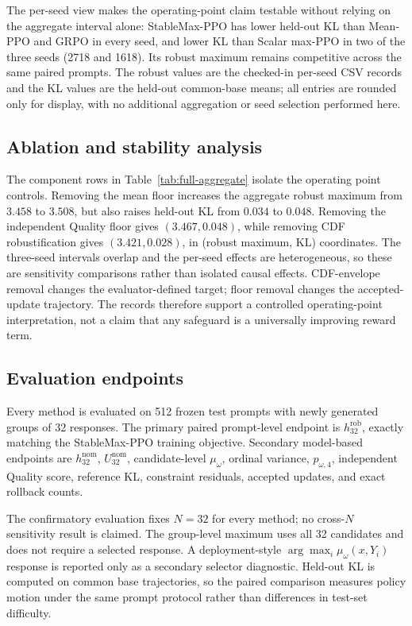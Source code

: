 The per-seed view makes the operating-point claim testable without relying on
the aggregate interval alone: StableMax-PPO has lower held-out KL than Mean-PPO
and GRPO in every seed, and lower KL than Scalar max-PPO in two of the three
seeds (2718 and 1618).  Its robust maximum remains competitive across the same paired prompts.
The robust values are the checked-in per-seed CSV records and the KL values are
the held-out common-base means; all entries are rounded only for display, with
no additional aggregation or seed selection performed here.

\subsection{Ablation and stability analysis}
\label{subsec:ablation-stability}

The component rows in Table~\ref{tab:full-aggregate} isolate the operating
point controls.  Removing the mean floor increases the aggregate robust maximum
from \(3.458\) to \(3.508\), but also raises held-out KL from \(0.034\) to
\(0.048\).  Removing the independent Quality floor gives
\((3.467,0.048)\), while removing CDF robustification gives
\((3.421,0.028)\), in (robust maximum, KL) coordinates.  The three-seed
intervals overlap and the per-seed effects are heterogeneous, so these are
sensitivity comparisons rather than isolated causal effects. CDF-envelope
removal changes the evaluator-defined target; floor removal changes the
accepted-update trajectory.  The records therefore support a controlled operating-point interpretation,
not a claim that any safeguard is a universally improving reward term.

\subsection{Evaluation endpoints}
\label{subsec:evaluation-endpoints}

Every method is evaluated on 512 frozen test prompts with newly generated
groups of 32 responses.  The primary paired prompt-level endpoint is
\(h_{32}^{\mathrm{rob}}\), exactly matching the StableMax-PPO
training objective.  Secondary model-based endpoints are
\(h_{32}^{\mathrm{nom}}\),
\(U_{32}^{\mathrm{nom}}\), candidate-level
\(\mu_\omega\), ordinal variance,
\(p_{\omega,4}\), independent Quality score, reference KL,
constraint residuals, accepted updates, and exact rollback counts.

The confirmatory evaluation fixes \(N=32\) for every method; no cross-\(N\)
sensitivity result is claimed.  The group-level maximum uses all 32 candidates
and does not require a selected response.  A deployment-style
\(\arg\max_i\mu_\omega(x,Y_i)\) response is reported only as a secondary
selector diagnostic.  Held-out KL is computed on common base trajectories, so
the paired comparison measures policy motion under the same prompt protocol
rather than differences in test-set difficulty.

